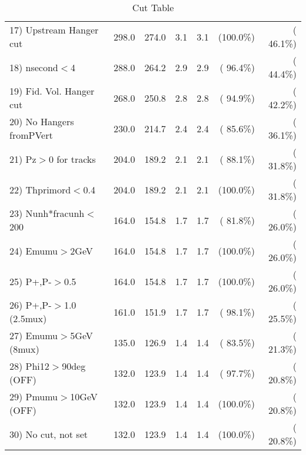 \begin{table}[h!]
\begin{tabular}{||l||r|r|r|r|r|r||}
 17) Upstream Hanger cut  &        298.0 &        274.0 &          3.1 &          3.1 & (100.0\%) & ( 46.1\%) \\
 18) nsecond$<$4          &        288.0 &        264.2 &          2.9 &          2.9 & ( 96.4\%) & ( 44.4\%) \\
 19) Fid. Vol. Hanger cut &        268.0 &        250.8 &          2.8 &          2.8 & ( 94.9\%) & ( 42.2\%) \\
 20) No Hangers fromPVert &        230.0 &        214.7 &          2.4 &          2.4 & ( 85.6\%) & ( 36.1\%) \\
 21) Pz$>$0 for tracks    &        204.0 &        189.2 &          2.1 &          2.1 & ( 88.1\%) & ( 31.8\%) \\
 22) Thprimord$<$0.4      &        204.0 &        189.2 &          2.1 &          2.1 & (100.0\%) & ( 31.8\%) \\
 23) Nunh*fracunh$<$200   &        164.0 &        154.8 &          1.7 &          1.7 & ( 81.8\%) & ( 26.0\%) \\
 24) Emumu$>$2GeV         &        164.0 &        154.8 &          1.7 &          1.7 & (100.0\%) & ( 26.0\%) \\
 25) P+,P-$>$0.5          &        164.0 &        154.8 &          1.7 &          1.7 & (100.0\%) & ( 26.0\%) \\
 26) P+,P-$>$1.0 (2.5mux) &        161.0 &        151.9 &          1.7 &          1.7 & ( 98.1\%) & ( 25.5\%) \\
 27) Emumu$>$5GeV  (8mux) &        135.0 &        126.9 &          1.4 &          1.4 & ( 83.5\%) & ( 21.3\%) \\
 28) Phi12$>$90deg  (OFF) &        132.0 &        123.9 &          1.4 &          1.4 & ( 97.7\%) & ( 20.8\%) \\
 29) Pmumu$>$10GeV  (OFF) &        132.0 &        123.9 &          1.4 &          1.4 & (100.0\%) & ( 20.8\%) \\
 30) No cut, not set      &        132.0 &        123.9 &          1.4 &          1.4 & (100.0\%) & ( 20.8\%) \\
 \hline
 \hline
 \end{tabular}
 \caption{Cut Table           }
 \label{tab-cutcohjpsi-mumu_anuecc}
 \end{table}
